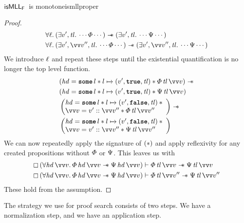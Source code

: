 \documentclass[thesis.tex]{subfiles}
\begin{document}
\begin{example}{$\textsf{\upshape isMLL}_{\textsf{\upshape F}}$\ is monotone}{ismllproper}
\begin{proof}
    \begin{align*}
       & \All \loc. (\Exists \val', \tl. \cdots \pred \cdots) \wand (\Exists \val', \tl. \cdots \predB \cdots)                               \\
       & \All \loc. (\Exists \val', \vect{\val}'', \tl. \cdots \pred \cdots) \wand (\Exists \val', \vect{\val}'', \tl. \cdots \predB \cdots)
    \end{align*}
    We introduce $\ell$ and repeat these steps until the existential quantification is no longer the top level function.
    \begin{align*}
       & (\hd = \Some l * l \fmapsto (\val', \True, \tl) * \pred\, \tl\, \vect{\val}) \wand \\
       & (\hd = \Some l * l \fmapsto (\val', \True, \tl) * \predB\, \tl\, \vect{\val})      \\
       &
      \left(\begin{array}{@{}l}
                \hd = \Some l * l \fmapsto (\val', \False, \tl)\spac * \\
                \vect{\val} = \val' :: \vect{\val}'' * \pred\, \tl\, \vect{\val}''
              \end{array}\right)
      \wand                                                                                 \\
       & \left(\begin{array}{@{}l}
                   \hd = \Some l * l \fmapsto (\val', \False, \tl)\spac * \\
                   \vect{\val} = \val' :: \vect{\val}'' * \predB\, \tl\, \vect{\val}''
                 \end{array}\right)
    \end{align*}
    We can now repeatedly apply the signature of $(*)$ and apply reflexivity for any created propositions without $\varPhi$ or $\Psi$. This leaves us with
    \begin{align*}
      \always{(\All \hd\, \vect{v}. \pred\, \hd\, \vect{v} \wand \predB\, \hd\, \vect{v})} & \proves \pred\, \tl\, \vect{\val} \wand \predB\, \tl\, \vect{\val}     \\
      \always{(\All \hd\, \vect{v}. \pred\, \hd\, \vect{v} \wand \predB\, \hd\, \vect{v})} & \proves \pred\, \tl\, \vect{\val}'' \wand \predB\, \tl\, \vect{\val}''
    \end{align*}
    These hold from the assumption.
  \end{proof}
\end{example}
The strategy we use for proof search consists of two steps. We have a normalization step, and we have an application step.
\end{document}
